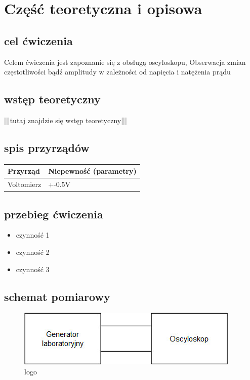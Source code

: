 \documentclass{article}  %
\begin{document}
\section{Część teoretyczna i opisowa}
\subsection{cel ćwiczenia}
Celem ćwiczenia jest zapoznanie się z obsługą oscyloskopu,
Obserwacja zmian częstotliwości bądź amplitudy w zależności od napięcia i natężenia prądu
\subsection{wstęp teoretyczny}
|||tutaj znajdzie się wstęp teoretyczny|||
\subsection{spis przyrządów}
\begin{table}[H]
    \centering
    \begin{tabular}{|l|l|}
    \hline
    Przyrząd    & Niepewność (parametry) \\ \hline
    Voltomierz  & +-0.5V                 \\ \hline
    \end{tabular}%
    \end{table}
\subsection{przebieg ćwiczenia}
    \begin{itemize}
        \item czynność 1
        \item czynność 2
        \item czynność 3
    \end{itemize}
    \subsection{schemat pomiarowy}
    \begin{figure}[H]
        \centering
        \includegraphics{schemat}
        \caption{logo}
        \end{figure}
\end{document}
